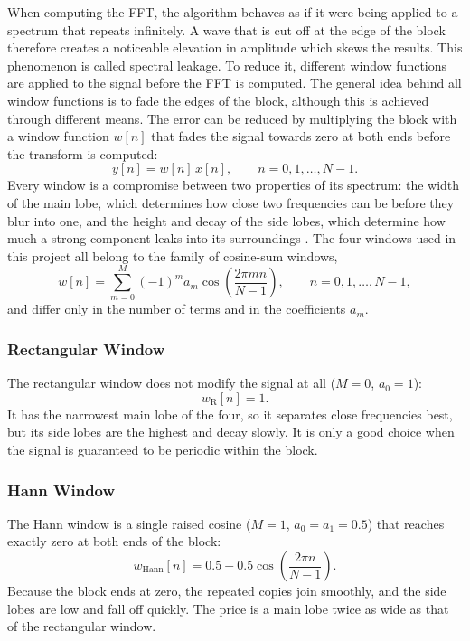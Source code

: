 When computing the FFT, the algorithm behaves as if it were being applied to
a spectrum that repeats infinitely. A wave that is cut off at the edge of the
block therefore creates a noticeable elevation in amplitude which skews the
results. This phenomenon is called spectral leakage. To reduce it, different
window functions are applied to the signal before the FFT is computed. The
general idea behind all window functions is to fade the edges of the block,
although this is achieved through different means. The error can be reduced
by multiplying the block with a window function $w[n]$ that fades the signal
towards zero at both ends before the transform is computed:
\begin{equation}
  y[n] = w[n]\, x[n], \qquad n = 0, 1, \dots, N-1.
  \label{eq:windowed-signal}
\end{equation}
Every window is a compromise between two properties of its spectrum: the width
of the main lobe, which determines how close two frequencies can be before
they blur into one, and the height and decay of the side lobes, which
determine how much a strong component leaks into its surroundings
\cite{harris1978windows}. The four windows used in this project all belong to
the family of cosine-sum windows,
\begin{equation}
  w[n] = \sum_{m=0}^{M} (-1)^m a_m \cos\!\left( \frac{2\pi m n}{N-1} \right),
  \qquad n = 0, 1, \dots, N-1,
  \label{eq:cosine-sum}
\end{equation}
and differ only in the number of terms and in the coefficients $a_m$.

\subsubsection{Rectangular Window}

The rectangular window does not modify the signal at all ($M=0$,
$a_0=1$):
\begin{equation}
  w_{\mathrm{R}}[n] = 1.
  \label{eq:rect}
\end{equation}
It has the narrowest main lobe of the four, so it separates close
frequencies best, but its side lobes are the highest and decay slowly. It is
only a good choice when the signal is guaranteed to be periodic within the
block.

\subsubsection{Hann Window}

The Hann window is a single raised cosine ($M=1$, $a_0=a_1=0.5$) that
reaches exactly zero at both ends of the block:
\begin{equation}
  w_{\mathrm{Hann}}[n] = 0.5 - 0.5 \cos\!\left( \frac{2\pi n}{N-1} \right).
  \label{eq:hann}
\end{equation}
Because the block ends at zero, the repeated copies join smoothly, and the
side lobes are low and fall off quickly. The price is a main lobe twice as
wide as that of the rectangular window.

